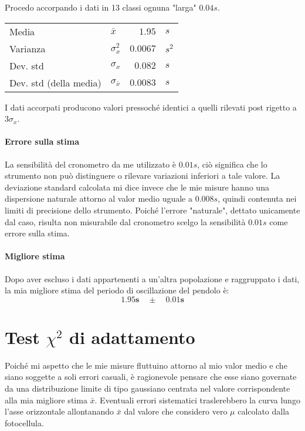 \documentclass{article}
\begin{document}
	\noindent
	Procedo accorpando i dati in 13 classi ognuna "larga" $0.04s$.
	
	\vspace{0.8cm}
	\begin{table}[H]
		\centering
		\begin{tabular}{llrl}
			Media                       & $\bar{x}$             & $1.95$        & $s$       \\
			Varianza                    & $\sigma_{x}^2$          & $0.0067$     & $s^2$  \\
			Dev. std                    & $\sigma_{x}$              & $0.082$      & $s$   \\
			Dev. std (della media)      & $\sigma_{\bar{x}}$    & $0.0083$     & $s$    
		\end{tabular}
	\end{table}
	\vspace{0.5cm}
	
	\noindent
	I dati accorpati producono valori pressoché identici a quelli rilevati post rigetto a $3\sigma_{x}$. \\
	
	
	\noindent
	\paragraph{Errore sulla stima} La sensibilità del cronometro da me utilizzato è $0.01s$, ciò significa che lo strumento non può distinguere o rilevare variazioni inferiori a tale valore. La deviazione standard calcolata mi dice invece che le mie misure hanno una dispersione naturale attorno al valor medio uguale a $0.008s$, quindi contenuta nei limiti di precisione dello strumento. Poiché l'errore "naturale", dettato unicamente dal caso, risulta non misurabile dal cronometro scelgo la sensibilità $0.01s$ come errore sulla stima.  \\
	
	\paragraph{Migliore stima} Dopo aver escluso i dati appartenenti a un'altra popolazione e raggruppato i dati, la mia migliore stima del  periodo di oscillazione del pendolo è:
	\[
	\mathbf{1.95s \quad \pm \quad 0.01 s}
	\]
	
	
	
	
	
	\newpage
	\section{Test $\chi ^2$ di adattamento}
	Poiché mi aspetto che le mie misure fluttuino attorno al mio valor medio e che siano soggette a soli errori casuali, è ragionevole pensare che esse siano governate da una distribuzione limite di tipo gaussiano centrata nel valore corrispondente alla mia migliore stima $\bar{x}$. Eventuali errori sistematici traslerebbero la curva lungo l'asse orizzontale allontanando $\bar{x}$ dal valore che considero vero $\mu$ calcolato dalla fotocellula. \\ 
	
\end{document}
